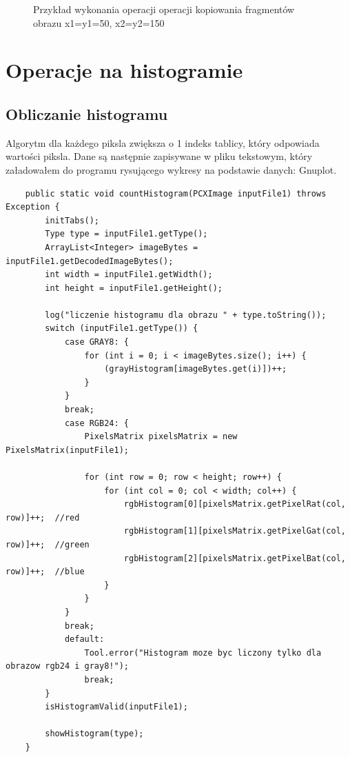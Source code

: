 \documentclass{article}
\begin{document}
\begin{figure}[!ht]
	\caption{Przykład wykonania operacji operacji kopiowania fragmentów obrazu x1=y1=50, x2=y2=150}
	\label{fig14}	
	\end{figure}
	
	
	
	
	
  \section{Operacje na histogramie}
	\subsection{Obliczanie histogramu}
	Algorytm dla każdego piksla zwiększa o 1 indeks tablicy, który odpowiada wartości piksla. Dane są następnie zapisywane w pliku tekstowym, który załadowałem do programu rysującego wykresy na podstawie danych: Gnuplot.
	\begin{verbatim}
	public static void countHistogram(PCXImage inputFile1) throws Exception {
        initTabs();
        Type type = inputFile1.getType();
        ArrayList<Integer> imageBytes = inputFile1.getDecodedImageBytes();
        int width = inputFile1.getWidth();
        int height = inputFile1.getHeight();

        log("liczenie histogramu dla obrazu " + type.toString());
        switch (inputFile1.getType()) {
            case GRAY8: {
                for (int i = 0; i < imageBytes.size(); i++) {
                    (grayHistogram[imageBytes.get(i)])++;
                }
            }
            break;
            case RGB24: {
                PixelsMatrix pixelsMatrix = new PixelsMatrix(inputFile1);

                for (int row = 0; row < height; row++) {
                    for (int col = 0; col < width; col++) {
                        rgbHistogram[0][pixelsMatrix.getPixelRat(col, row)]++;  //red
                        rgbHistogram[1][pixelsMatrix.getPixelGat(col, row)]++;  //green
                        rgbHistogram[2][pixelsMatrix.getPixelBat(col, row)]++;  //blue
                    }
                }
            }
            break;
            default:
                Tool.error("Histogram moze byc liczony tylko dla obrazow rgb24 i gray8!");
                break;
        }
        isHistogramValid(inputFile1);

        showHistogram(type);
    }
	\end{verbatim}
	
\end{document}

